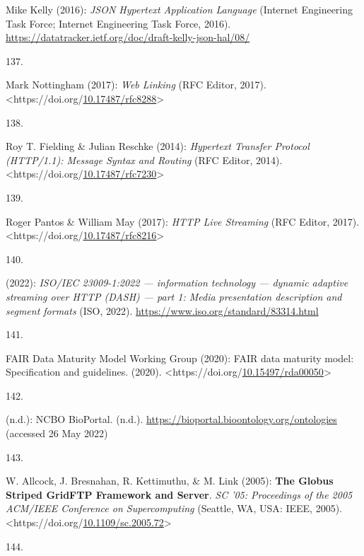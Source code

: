 \begin{thebibliography}{9}
Mike Kelly (2016): \emph{{JSON Hypertext Application Language}}
(Internet Engineering Task Force; Internet Engineering Task Force,
2016). \url{https://datatracker.ietf.org/doc/draft-kelly-json-hal/08/}

\hypertarget{ref-rfc8288}{}
137.

Mark Nottingham (2017): \emph{Web {Linking}} ({RFC Editor}, 2017).
\textless https://doi.org/\href{https://doi.org/10.17487/rfc8288}{10.17487/rfc8288}\textgreater{}

\hypertarget{ref-rfc7230}{}
138.

Roy T. Fielding \& Julian Reschke (2014): \emph{Hypertext {Transfer
Protocol} ({HTTP}/1.1): {Message Syntax} and {Routing}} ({RFC Editor},
2014).
\textless https://doi.org/\href{https://doi.org/10.17487/rfc7230}{10.17487/rfc7230}\textgreater{}

\hypertarget{ref-rfc8216}{}
139.

Roger Pantos \& William May (2017): \emph{{HTTP Live Streaming}} ({RFC
Editor}, 2017).
\textless https://doi.org/\href{https://doi.org/10.17487/rfc8216}{10.17487/rfc8216}\textgreater{}

\hypertarget{ref-iso23009}{}
140.

(2022): \emph{{ISO}/{IEC} 23009-1:2022 --- information technology ---
dynamic adaptive streaming over HTTP (DASH) --- part 1: Media
presentation description and segment formats} ({ISO}, 2022).
\url{https://www.iso.org/standard/83314.html}

\hypertarget{ref-groupFAIRDataMaturity2020}{}
141.

FAIR Data Maturity Model Working Group (2020): {FAIR} data maturity
model: {Specification} and guidelines. (2020).
\textless https://doi.org/\href{https://doi.org/10.15497/rda00050}{10.15497/rda00050}\textgreater{}

\hypertarget{ref-NCBOBioPortal}{}
142.

(n.d.): {NCBO BioPortal}. (n.d.).
\url{https://bioportal.bioontology.org/ontologies} (accessed 26 May
2022)

\hypertarget{ref-allcockGlobusStripedGridFTP}{}
143.

W. Allcock, J. Bresnahan, R. Kettimuthu, \& M. Link (2005): \textbf{The
{Globus Striped GridFTP Framework} and {Server}}. \emph{{SC '05:
Proceedings of the 2005 ACM/IEEE Conference on Supercomputing}}
({Seattle, WA, USA}: {IEEE}, 2005).
\textless https://doi.org/\href{https://doi.org/10.1109/sc.2005.72}{10.1109/sc.2005.72}\textgreater{}

\hypertarget{ref-ARKIdentifierScheme}{}
144.


\end{thebibliography}
